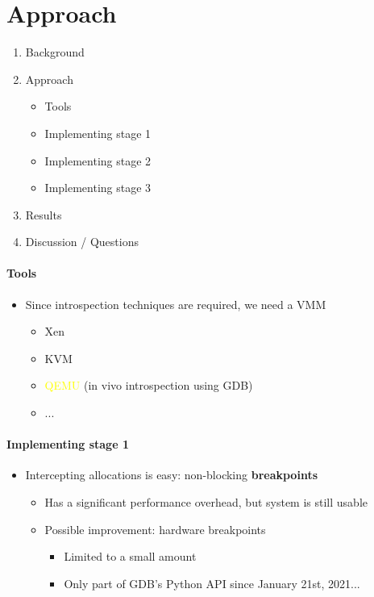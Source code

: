 \documentclass{i20lecture}
\begin{document}
\section{Approach}
\begin{frame}{\insertsection}
  \begin{enumerate}
   \item Background
    \item Approach
    \begin{itemize}
        \item Tools
        \item Implementing stage 1
        \item Implementing stage 2
        \item Implementing stage 3
    \end{itemize}
    \item Results
    \item Discussion / Questions
  \end{enumerate}
\end{frame}

\begin{frame}{\insertsection}
  \framesubtitle{Tools}

  \begin{itemize}
   \item Since introspection techniques are required, we need a VMM
\pause
    \begin{itemize}
    \item Xen
    \item KVM
	\item \textcolor{yellow}{QEMU} (in vivo introspection using GDB)
    \item ...
    \end{itemize}
  \end{itemize}
\end{frame}

\begin{frame}{\insertsection}
  \framesubtitle{Implementing stage 1}

    \begin{itemize}
	\item Intercepting allocations is easy: non-blocking \textbf{breakpoints}
     \begin{itemize}
\pause
      \item Has a significant performance overhead, but system is still usable
\pause
      \item Possible improvement: hardware breakpoints
\pause
        \begin{itemize}
			\item Limited to a small amount
\pause
            \item Only part of GDB's Python API since January 21st, 2021...
        \end{itemize}
     \end{itemize}
    \end{itemize}
\end{frame}
\end{document}
